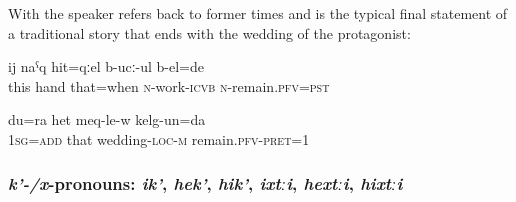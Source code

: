 With  the speaker refers back to former times and  is the typical final statement of a traditional story that ends with the wedding of the protagonist:
%
\begin{exe}
	\ex	\label{At that time this hand (of mine) was still working}
	\gll	ij	naˁq	hit=qːel	b-ucː-ul	b-el=de\\
		this	hand	that=when	\textsc{n}-work-\textsc{icvb}	\textsc{n}-remain.\textsc{pfv}=\textsc{pst}\\
	\glt	{}

	\ex	\label{I have been to this wedding as well.}
	\gll	du=ra	het	meq-le-w	kelg-un=da\\
		\textsc{1sg}=\textsc{add}	that	wedding-\textsc{loc}-\textsc{m}	remain.\textsc{pfv}-\textsc{pret=1}\\
	\glt	{}
\end{exe}



\subsubsection{\textit{k'-/x}-pronouns: \textit{ik'}, \textit{hek'}, \textit{hik'}, \textit{ixtːi}, \textit{hextːi}, \textit{hixtːi}}
\label{sssec:k-x-pronouns}

